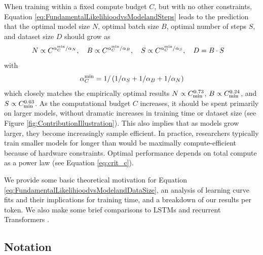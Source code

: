 \documentclass[english]{article}
\newcommand{\be}{\begin{equation}}
\newcommand{\ee}{\end{equation}}
\begin{document}
When training within a fixed compute budget $C$, but with no other constraints, Equation \eqref{eq:FundamentalLikelihioodvsModelandSteps} leads to the prediction that the optimal model size $N$, optimal batch size $B$, optimal number of steps $S$, and dataset size $D$ should grow as 
\be
\label{eq:OptimalModelSizeTrainingTimevsCompute}
N \propto C^{\alpha_{C}^{\rm min} /\alpha_{N}}, \quad
B \propto C^{\alpha_C^{\rm min} / \alpha_B}, \quad
S \propto C^{\alpha_C^{\rm min} / \alpha_S}, \quad
D = B\cdot S \quad
\ee
with
\be
\alpha_{C}^{\rm min} = 1/\left(1/\alpha_{S}+1/\alpha_{B}+1/\alpha_{N}\right) 
\ee
which closely matches the empirically optimal results $N \propto C_{\rm min}^{0.73}$, $B \propto C_{\rm min}^{0.24}$, and $S \propto C_{\rm min}^{0.03}$.  As the computational budget $C$ increases, it should be spent primarily on larger models, without dramatic increases in training time or dataset size (see Figure \ref{fig:ContributionIllustration}).  This also implies that as models grow larger, they  become increasingly sample efficient.  In practice, researchers typically train  smaller models for  longer than would be maximally compute-efficient because of  hardware constraints.
Optimal performance depends on total compute as a power law (see Equation \eqref{eq:crit_c}).

We  provide some basic theoretical motivation for Equation \eqref{eq:FundamentalLikelihioodvsModelandDataSize}, an analysis of learning curve fits and their implications for training time, and a breakdown of our results per token.  We also make some brief comparisons to LSTMs and recurrent Transformers \cite{DBLP:journals/corr/abs-1807-03819}.

\subsection{Notation}
\end{document}

